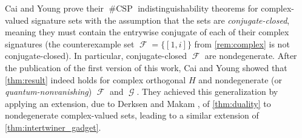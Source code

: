 \documentclass{theoretics}
\DeclareMathOperator{\fc}{\mathcal{F}}
\DeclareMathOperator{\gc}{\mathcal{G}}
\DeclareMathOperator{\csp}{\#CSP}
\begin{document}
Cai and Young \cite{cai_planar_2023,young2022equality} prove their $\csp$
indistinguishability theorems for complex-valued signature sets with the assumption that the sets
are \emph{conjugate-closed}, meaning they must contain the entrywise conjugate of each of 
their complex signatures (the counterexample set $\fc = \{[1,i]\}$ from \autoref{rem:complex} 
is not conjugate-closed). In particular, conjugate-closed $\fc$ are nondegenerate.
After the publication of the first version \cite{orthogonal} of
this work, Cai and Young \cite{bipartite} showed that 
\autoref{thm:result} indeed holds for complex orthogonal $H$ and nondegenerate
(or \emph{quantum-nonvanishing}) $\fc$ and $\gc$. They achieved this generalization by
applying an extension, due to Derksen and Makam \cite{prop}, of 
\autoref{thm:duality} to nondegenerate complex-valued sets,
leading to a similar extension of \autoref{thm:intertwiner_gadget}.
\end{document}
